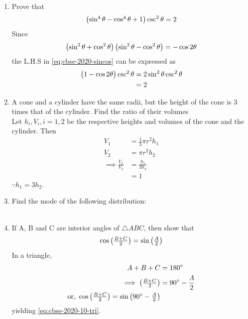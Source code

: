 \documentclass[journal,12pt,twocolumn]{IEEEtran}
\begin{document}
\begin{enumerate}
    \item Prove that
	    \begin{align}
		    \label{eq;cbse-2020-sincos}
    \begin{pmatrix}\sin^4\theta  - \cos^4\theta + 1\end{pmatrix} \csc^2\theta = 2
		    \end{align}
    \solution Since 
	    \begin{align}
\left(\sin^2\theta  + \cos^2\theta \right)
\left(\sin^2\theta  - \cos^2\theta \right)
= -\cos 2 \theta
		    \end{align}
		    the L.H.S in 
		    \eqref{eq;cbse-2020-sincos}
		    can be expressed as 
	    \begin{align}
		    \label{eq;cbse-2020-sincos_simp}
		    \begin{pmatrix}1-\cos2\theta\end{pmatrix} \csc^2\theta &= 
2 \sin^2 \theta \csc^2\theta 
\\
		    &= 2
		    \end{align}
    
    \item A cone and a cylinder have the same radii, but the height of the cone is 3 times that of the cylinder. Find the ratio of their volumes\\
   \solution Let $h_i, V_i, i = 1,2$ be the respective heights and volumes of the cone and the cylinder. 
   Then 
  \begin{align}
	  V_1 &= \frac{1}{3} \pi r^2 h_1
	  \\
	  V_2 &=  \pi r^2 h_2
	  \\
	  \implies \frac{V_1}{V_2} &= \frac{h_1}{3h_2}
	  \\
	  &= 1
  \end{align}
  $\because h_1 = 3h_2$.
      
     \item Find the mode of the following distribution:\\
     \vspace{2mm}\\
     \vspace{2mm}
     
    
    
    \item If A, B and C are interior angles of $\triangle ABC$, then show that
		    \begin{align}
			    \label{eq:cbse-2020-10-tri}
    \cos \begin{pmatrix}\frac{B + C}{2}\end{pmatrix} = \sin \begin{pmatrix}\frac{A}{2}\end{pmatrix}
		    \end{align}
		    \solution In a triangle,
		    \begin{align}
			    A+B+C &= 180\degree
			    \\
			    \implies \begin{pmatrix}\frac{B + C}{2}\end{pmatrix} &= 90\degree-\frac{A}{2}
			    \\
			    \text{or, }    \cos \begin{pmatrix}\frac{B + C}{2}\end{pmatrix} = \sin \begin{pmatrix}90\degree -\frac{A}{2}\end{pmatrix}
		    \end{align}
			    yielding \eqref{eq:cbse-2020-10-tri}.


\end{enumerate}
\end{document}
